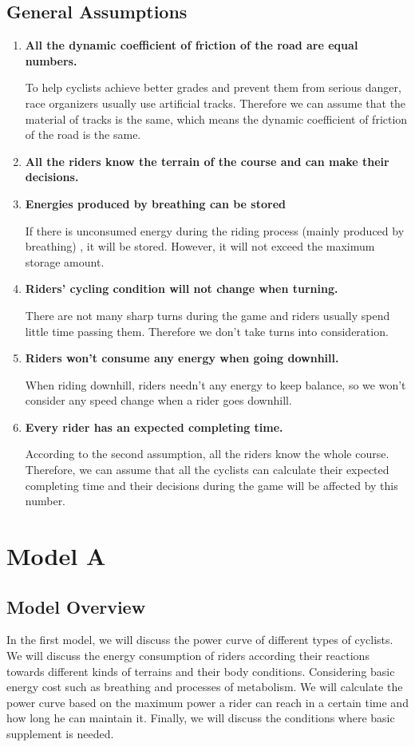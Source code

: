 \documentclass{article}
\begin{document}
	\subsection{General Assumptions}
	\begin{enumerate}
		\item  \textbf{All the dynamic coefficient of friction of the road are equal numbers.}

				To help cyclists achieve better grades and prevent them from serious danger, race organizers usually use artificial tracks. Therefore we can assume that the material of tracks is the same, which means the dynamic coefficient of friction of the road is the same.
		\item  \textbf{All the riders know the terrain of the course and can make their decisions.}
		\item  \textbf{Energies produced by breathing can be stored}

				If there is unconsumed energy during the riding process (mainly produced by breathing) , it will be stored. However, it will not exceed the maximum storage amount.
		\item  \textbf{Riders' cycling condition will not change when turning.}

				There are not many sharp turns during the game and riders usually spend little time passing them. Therefore we don't take turns into consideration.
		\item \textbf{Riders won't consume any energy when going downhill.}

				When riding downhill, riders needn't any energy to keep balance, so we won't consider any speed change when a rider goes downhill.
		\item \textbf{Every rider has an expected completing time.}

				According to the second assumption, all the riders know the whole course. Therefore, we can assume that all the cyclists can calculate their expected completing time and their decisions during the game will be affected by this number.

	\end{enumerate}

	\section{Model A}
	\subsection{Model Overview}
	In the first model, we will discuss the power curve of different types of cyclists. We will discuss the energy consumption of riders according their reactions towards different kinds of terrains and their body conditions. Considering basic energy cost such as breathing and processes of metabolism. We will calculate the power curve based on the maximum power a rider can reach in a certain time and how long he can maintain it. Finally, we will discuss the conditions where basic supplement is needed.
\end{document}
